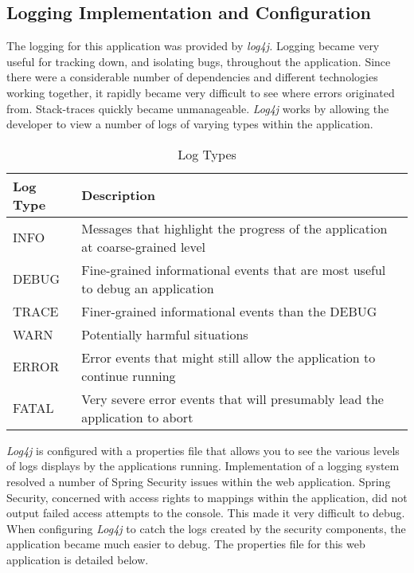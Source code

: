 \subsection{Logging Implementation and Configuration}

The logging for this application was provided by \textit{log4j.} Logging became very useful for tracking down, and isolating bugs, throughout the application. Since there were a considerable number of dependencies and different technologies working together, it rapidly became very difficult to see where errors originated from. Stack-traces quickly became unmanageable. \textit{Log4j} works by allowing the developer to view a number of logs of varying types within the application.
\begin{table}[H]
\begin{center}
    \begin{tabular}{ | l | l | p{5cm} |}
    \hline
    Log Type & Description \\ \hline
    INFO & Messages that highlight the progress of the application at coarse-grained level  \\ \hline
    DEBUG & Fine-grained informational events that are most useful to debug an application\\ \hline
	TRACE & Finer-grained informational events than the DEBUG\\ \hline
	WARN & Potentially harmful situations\\ \hline
	ERROR & Error events that might still allow the application to continue running\\ \hline
    FATAL & Very severe error events that will presumably lead the application to abort\\ \hline
    \end{tabular}
\end{center}
\caption{Log Types}
\end{table}

\textit{Log4j} is configured with a properties file that allows you to see the various levels of logs displays by the applications running. Implementation of a logging system resolved a number of Spring Security issues within the web application. Spring Security, concerned with access rights to mappings within the application, did not output failed access attempts to the console. This made it very difficult to debug. When configuring \textit{Log4j} to catch the logs created by the security components, the application became much easier to debug. The properties file for this web application is detailed below.

